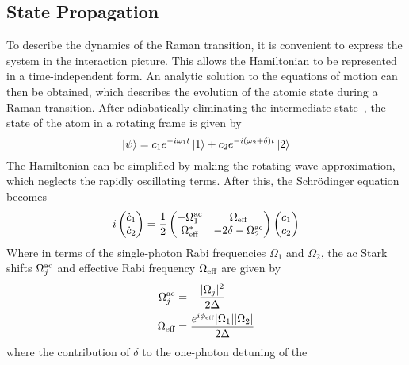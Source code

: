 \subsection{State Propagation}
To describe the dynamics of the Raman transition, it is convenient to
express the system in the interaction picture. This allows the
Hamiltonian to be represented in a time-independent form. An analytic
solution to the equations of motion can then be obtained, which
describes the evolution of the atomic state during a Raman transition. After adiabatically
eliminating the intermediate state~\cite{Weiss1994}, the state of the
atom in a rotating frame is given by
\begin{equation}
  \label{eq:state_raman}
  \ket{\psi} = c_1 e^{-i \omega_1 t}\ket{1} + c_2 e^{-i (\omega_2 +
  \delta) t} \ket{2}
\end{equation}
The Hamiltonian can be simplified by making the rotating wave
approximation, which neglects the rapidly oscillating terms. After
this, the Schr\"odinger equation becomes
\begin{equation}
  \label{eq:raman_eom}
  i \begin{pmatrix} \dot{c}_1 \\ \dot{c}_2 \end{pmatrix} =
  \frac{1}{2}\begin{pmatrix}
    -\Omega_1^\textnormal{ac} & \Omega_\textnormal{eff} \\
    \Omega_\textnormal{eff}^*&  -2\delta - \Omega_2^\textnormal{ac}  \\
    \end{pmatrix} \begin{pmatrix} c_1 \\ c_2\end{pmatrix}
\end{equation}
Where in terms of the single-photon Rabi frequencies $\Omega_1$ and
$\Omega_2$, the ac Stark shifts $\Omega_j^\textnormal{ac}$ and
effective Rabi frequency $\Omega_\textnormal{eff}$ are given by 
\begin{subequations}
\begin{align}
  \Omega_j^\textnormal{ac} &= -\frac{|\Omega_j|^2}{2 \Delta
  }\label{eq:raman_ac_stark}\\
  \Omega_\textnormal{eff}&=\frac{e^{i\phi_\textnormal{eff}} |\Omega_1|
    |\Omega_2|}{2 \Delta }\label{eq:raman_rabi} 
\end{align}
\end{subequations}
where the contribution of $\delta$ to the one-photon detuning of the
